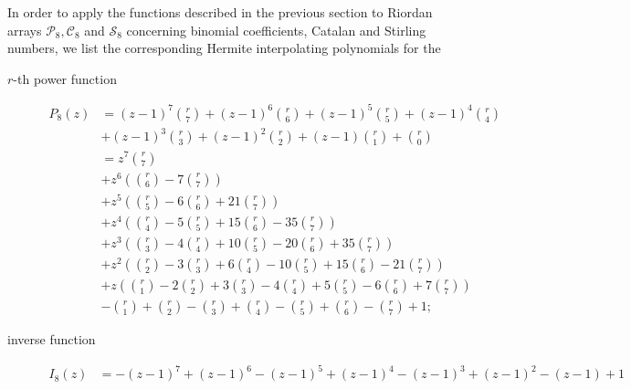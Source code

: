 In order to apply the functions described in the previous section to
Riordan arrays $\mathcal{P}_{8}, \mathcal{C}_{8}$ and $\mathcal{S}_{8}$
concerning binomial coefficients, Catalan and Stirling numbers, 
we list  the corresponding Hermite interpolating polynomials for the
\begin{description}
\item[$r$-th power function]
\begin{displaymath}
    \begin{split}
        P_{8}\left (z \right )  &= \left(z - 1\right)^{7} {\binom{r}{7}} + \left(z - 1\right)^{6} {\binom{r}{6}} + \left(z - 1\right)^{5} {\binom{r}{5}} + \left(z - 1\right)^{4} {\binom{r}{4}}\\
                            &+ \left(z - 1\right)^{3} {\binom{r}{3}} + \left(z - 1\right)^{2} {\binom{r}{2}} + \left(z - 1\right) {\binom{r}{1}} + {\binom{r}{0}} \\
                            &= z^{7} {\binom{r}{7}} \\
                            &+ z^{6} \left({\binom{r}{6}} - 7 {\binom{r}{7}}\right) \\
                            &+ z^{5} \left({\binom{r}{5}} - 6 {\binom{r}{6}} + 21 {\binom{r}{7}}\right) \\
                            &+ z^{4} \left({\binom{r}{4}} - 5 {\binom{r}{5}} + 15 {\binom{r}{6}} - 35 {\binom{r}{7}}\right) \\
                            &+ z^{3} \left({\binom{r}{3}} - 4 {\binom{r}{4}} + 10 {\binom{r}{5}} - 20 {\binom{r}{6}} + 35 {\binom{r}{7}}\right) \\
                            &+ z^{2} \left({\binom{r}{2}} - 3 {\binom{r}{3}} + 6 {\binom{r}{4}} - 10 {\binom{r}{5}} + 15 {\binom{r}{6}} - 21 {\binom{r}{7}}\right) \\
                            &+ z \left({\binom{r}{1}} - 2 {\binom{r}{2}} + 3 {\binom{r}{3}} - 4 {\binom{r}{4}} + 5 {\binom{r}{5}} - 6 {\binom{r}{6}} + 7 {\binom{r}{7}}\right) \\
                            &- {\binom{r}{1}} + {\binom{r}{2}} - {\binom{r}{3}} + {\binom{r}{4}} - {\binom{r}{5}} + {\binom{r}{6}} - {\binom{r}{7}} + 1;
    \end{split}
\end{displaymath}
\item[inverse function]
\begin{displaymath}
    \begin{split} 
        I_{8}{\left (z \right )} &= - \left(z - 1\right)^{7} + \left(z - 1\right)^{6} - \left(z - 1\right)^{5} + \left(z - 1\right)^{4} - \left(z - 1\right)^{3} + \left(z - 1\right)^{2} - (z-1) + 1\\

\end{split}
\end{displaymath}
\end{description}
